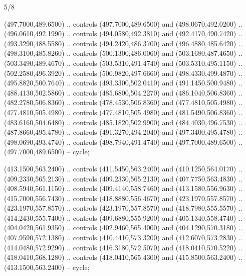 \begin{flagdescription}{5/8}
\begin{scope}[shift={(m)}]
\begin{scope}[scale=\flagwidth/220,y=0.1mm, x=0.1mm, yscale=-1,shift={(-596,-360)}]
\begin{scope}[cm={{-1.0,0.0,0.0,1.0,(1193.9797,0.0)}}]
\begin{scope}[draw=black,line join=round,line cap=round,line width=0.381\lw]
\begin{scope}[line width=0.534\lw,fill=green]
 (497.7000,489.6500) .. controls (497.7000,489.6500) and
  (498.0670,492.0200) .. (496.0610,492.1990) .. controls (494.0580,492.3810) and
  (492.4170,490.7420) .. (493.3290,488.5580) .. controls (494.2420,486.3700) and
  (496.4880,485.6420) .. (498.3100,485.8260) .. controls (500.1300,486.0060) and
  (503.1680,487.4650) .. (503.3490,489.4670) .. controls (503.5310,491.4740) and
  (503.5310,495.1150) .. (502.2580,496.3920) .. controls (500.9820,497.6660) and
  (498.4330,499.4870) .. (495.8820,500.7640) .. controls (493.3300,502.0410) and
  (491.1450,500.9480) .. (488.4130,502.5860) .. controls (485.6800,504.2270) and
  (486.1040,506.8360) .. (482.2780,506.8360) .. controls (478.4530,506.8360) and
  (477.4810,505.4980) .. (477.4810,505.4980) .. controls (477.4810,505.4980) and
  (481.5490,506.8360) .. (483.6160,504.6480) .. controls (485.1820,502.9900) and
  (484.4030,496.7530) .. (487.8660,495.4780) .. controls (491.3270,494.2040) and
  (497.3400,495.4780) .. (498.0690,493.4740) .. controls (498.7940,491.4740) and
  (497.7000,489.6500) .. (497.7000,489.6500) -- cycle;

 (413.1500,563.2400) .. controls (411.5450,563.2400) and
  (410.1250,564.0170) .. (409.2330,565.2130) .. controls (409.2330,565.2130) and
  (407.7750,563.4830) .. (408.5940,561.1150) .. controls (409.4140,558.7460) and
  (413.1580,556.9630) .. (415.7000,556.7430) .. controls (418.8880,556.4670) and
  (423.1970,557.8570) .. (423.1970,557.8570) .. controls (423.1970,557.8570) and
  (418.7980,555.5570) .. (414.2430,555.7400) .. controls (409.6880,555.9200) and
  (405.1340,558.4740) .. (404.0420,561.9350) .. controls (402.9460,565.4000) and
  (404.1290,570.3180) .. (407.9590,572.1380) .. controls (410.4410,573.3200) and
  (412.6070,573.2830) .. (414.0480,572.9290) .. controls (416.3180,572.5070) and
  (418.0410,570.5220) .. (418.0410,568.1280) .. controls (418.0410,565.4300) and
  (415.8500,563.2400) .. (413.1500,563.2400) -- cycle;


\end{scope}
\end{scope}
\end{scope}
\end{scope}
\end{scope}
\end{flagdescription}

